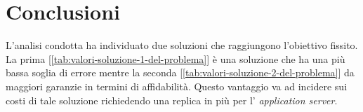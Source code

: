 \documentclass[../main.tex]{subfiles}
\begin{document}
    \chapter{Conclusioni}\label{ch:conclusioni}
    L'analisi condotta ha individuato due soluzioni che raggiungono l'obiettivo fissito.
    La prima [\ref{tab:valori-soluzione-1-del-problema}] è una soluzione che ha una più bassa soglia di errore mentre la
    seconda [\ref{tab:valori-soluzione-2-del-problema}] da maggiori garanzie in termini di affidabilità.
    Questo vantaggio va ad incidere sui costi di tale soluzione richiedendo una replica in più per l'
    \textit{application server}.
\end{document}
